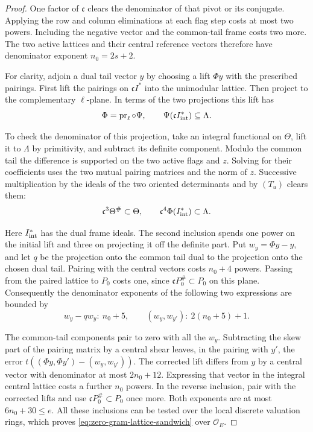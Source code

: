\begin{proof}
One factor of
\(\mathfrak c\) clears the denominator of that pivot or its
conjugate. Applying the row and column eliminations at each flag
step costs at most two powers. Including the negative vector
and the common-tail frame costs two more. The two active lattices
and their central reference vectors therefore have denominator
exponent \(n_0=2s+2\).

For clarity, adjoin a dual tail vector \(y\) by choosing a lift
\(\Phi y\) with the prescribed pairings. First lift the pairings on \(\mathfrak c I^*\) into the
unimodular lattice. Then project to the complementary \(\ell\)-plane.
In terms of the two projections this lift has
\[
   \Phi=\operatorname{pr}_{\ell}\circ\Psi,\qquad
     \Psi(\mathfrak c I^*_{\rm int})\subseteq\Lambda .
\]

To check the denominator of this projection, take an integral
functional on \(\Theta\), lift it to \(\Lambda\) by primitivity,
and subtract its definite component. Modulo the common tail the
difference is supported on the two active flags and \(z\).
Solving for their coefficients uses the two mutual pairing matrices
and the norm of \(z\). Successive multiplication by the ideals of
the two oriented determinants and by \((T_u)\) clears them:
\[
 \mathfrak c^3\Theta^\#\subset\Theta,\qquad
     \mathfrak c^4\Phi(I^*_{\rm int})\subset\Lambda .
\]

Here \(I^*_{\rm int}\) has the dual frame ideals. The second
inclusion spends one power on the initial lift and three on
projecting it off the definite part. Put \(w_y=\Phi y-y\), and let \(q\) be the projection onto the
common tail dual to the projection onto the chosen dual tail.
Pairing with the central vectors costs \(n_0+4\) powers. Passing
from the paired lattice to \(P_0\) costs one, since
\(\mathfrak c P_0^\#\subset P_0\) on this plane. Consequently
the denominator exponents of the following two expressions are
bounded by
\[
    w_y-qw_y:\ n_0+5,\qquad
    (w_y,w_{y'}):\ 2(n_0+5)+1 .
\]

The common-tail components pair to zero with all the \(w_y\).
Subtracting the skew part of the pairing matrix by a central
shear leaves, in the pairing with \(y'\), the error
\(t((\Phi y,\Phi y')-(w_y,w_{y'}))\).
The corrected lift differs from \(y\) by a central vector with
denominator at most \(2n_0+12\). Expressing that vector in the
integral central lattice costs a further \(n_0\) powers.
In the reverse inclusion, pair with the corrected lifts and use
\(\mathfrak c P_0^\#\subset P_0\) once more. Both exponents are at
most \(6n_0+30\le e\). All these inclusions can be tested over
the local discrete valuation rings, which proves
\eqref{eq:zero-gram-lattice-sandwich} over \(\mathcal O_E\).


\end{proof}
